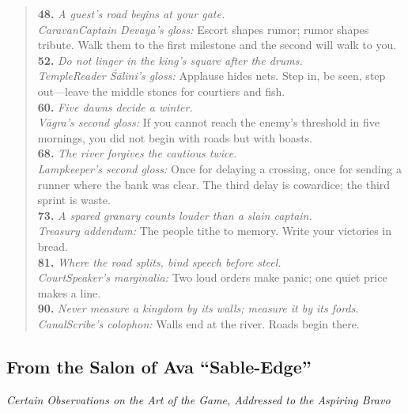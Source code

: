\documentclass[11pt]{article}
\begin{document}
\begin{quote}
\textbf{48.} \emph{A guest's road begins at your gate.}\\
\textit{Caravan\textendash Captain Devaya's gloss:} Escort shapes rumor; rumor shapes tribute. Walk them to the first milestone and the second will walk to you.\\[0.35em]

\textbf{52.} \emph{Do not linger in the king's square after the drums.}\\
\textit{Temple\textendash Reader Śālini's gloss:} Applause hides nets. Step in, be seen, step out---leave the middle stones for courtiers and fish.\\[0.35em]

\textbf{60.} \emph{Five dawns decide a winter.}\\
\textit{Vāgra's second gloss:} If you cannot reach the enemy's threshold in five mornings, you did not begin with roads but with boasts.\\[0.35em]

\textbf{68.} \emph{The river forgives the cautious twice.}\\
\textit{Lampkeeper's second gloss:} Once for delaying a crossing, once for sending a runner where the bank was clear. The third delay is cowardice; the third sprint is waste.\\[0.35em]

\textbf{73.} \emph{A spared granary counts louder than a slain captain.}\\
\textit{Treasury addendum:} The people tithe to memory. Write your victories in bread.\\[0.35em]

\textbf{81.} \emph{Where the road splits, bind speech before steel.}\\
\textit{Court\textendash Speaker's marginalia:} Two loud orders make panic; one quiet price makes a line.\\[0.35em]

\textbf{90.} \emph{Never measure a kingdom by its walls; measure it by its fords.}\\
\textit{Canal\textendash Scribe's colophon:} Walls end at the river. Roads begin there.
\end{quote}

\subsection{From the Salon of Ava ``Sable-Edge''}
\noindent\textit{Certain Observations on the Art of the Game, Addressed to the Aspiring Bravo}
\end{document}
